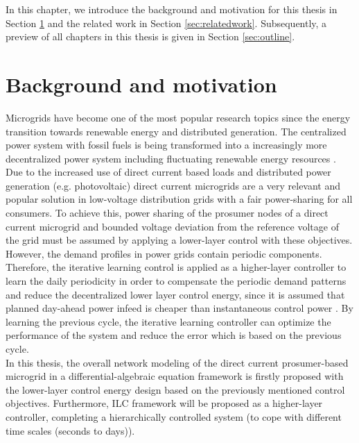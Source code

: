 In this chapter, we introduce the background and motivation for this thesis in Section \ref{sec:motivation} and the related work in Section \ref{sec:relatedwork}. Subsequently, a preview of all chapters in this thesis is given in Section \ref{sec:outline}. 

\section{Background and motivation}
\label{sec:motivation}
Microgrids have become one of the most popular research topics since the energy transition towards renewable energy and distributed generation. The centralized power system with fossil fuels is being transformed into a increasingly more decentralized power system including fluctuating renewable energy resources \cite{xiaohan_master}. Due to the increased use of direct current based loads and distributed power generation (e.g. photovoltaic) direct current microgrids are a very relevant and popular solution in low-voltage distribution grids with a fair power-sharing for all consumers. To achieve this, power sharing of the prosumer nodes of a direct current microgrid and bounded voltage deviation from the reference voltage of the grid must be assumed \cite{lia_master} by applying a lower-layer control with these objectives. 
\\However, the demand profiles in power grids contain periodic components.
Therefore, the iterative learning control is applied as a higher-layer controller to learn the daily periodicity in order to compensate the periodic demand patterns and reduce the decentralized lower layer control energy, since it is assumed that planned day-ahead power infeed is cheaper than instantaneous control power \cite{paperilc,xiaohan_master}. By learning the previous cycle, the iterative learning controller can optimize the performance of the system and reduce the error which is based on the previous cycle.
\\In this thesis, the overall network modeling of the direct current prosumer-based microgrid in a differential-algebraic equation framework is firstly proposed with the lower-layer control energy design based on the previously mentioned control objectives.
Furthermore, ILC framework will be proposed as a higher-layer controller, completing a hierarchically controlled system (to cope with different time scales (seconds to days)). 
